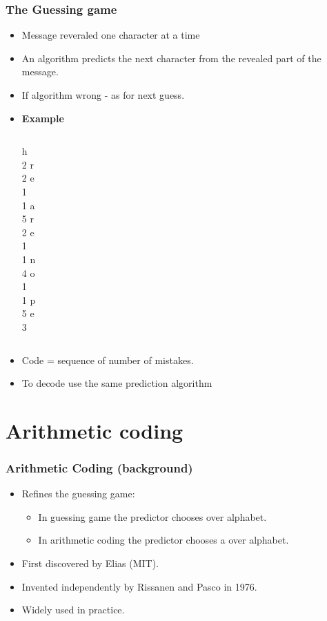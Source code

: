 \documentclass[handout]{beamer}
\newcommand{\R}[1]{{\color{red}{#1}}}
\begin{document}
\begin{frame}
\frametitle{The Guessing game}
\begin{itemize}
\item
Message reveraled one character at a time
\item
An algorithm predicts the next character from the revealed part of the message.
\item
If algorithm wrong - as for next guess.
\item
{\bf Example} 
\begin{columns}
\column[t]{0.1cm} h \\ 2 
\column[t]{0.1cm} r \\ 2 
\column[t]{0.1cm} e \\ 1 
\column[t]{0.1cm}   \\ 1 
\column[t]{0.1cm} a \\ 5 
\column[t]{0.1cm} r \\ 2 
\column[t]{0.1cm} e \\ 1 
\column[t]{0.1cm}   \\ 1 
\column[t]{0.1cm} n \\ 4 
\column[t]{0.1cm} o \\ 1 
\column[t]{0.1cm}   \\ 1 
\column[t]{0.1cm} p \\ 5 
\column[t]{0.1cm} e \\ 3 
\end{columns}
\item
Code = sequence of number of mistakes.
\item
To decode use the same prediction algorithm
\end{itemize}

\end{frame}

\section{Arithmetic coding}

\begin{frame}
\frametitle{Arithmetic Coding (background)}
\begin{itemize}
\item Refines the guessing game:
\begin{itemize}
\item In guessing game the predictor chooses \R{order} over alphabet.
\item In arithmetic coding the predictor chooses a \R{Distribution} over alphabet.
\end{itemize}
\item First discovered by Elias (MIT).
\item Invented independently by Rissanen and Pasco in 1976.
\item Widely used in practice.
\end{itemize}
\end{frame}
\end{document}
